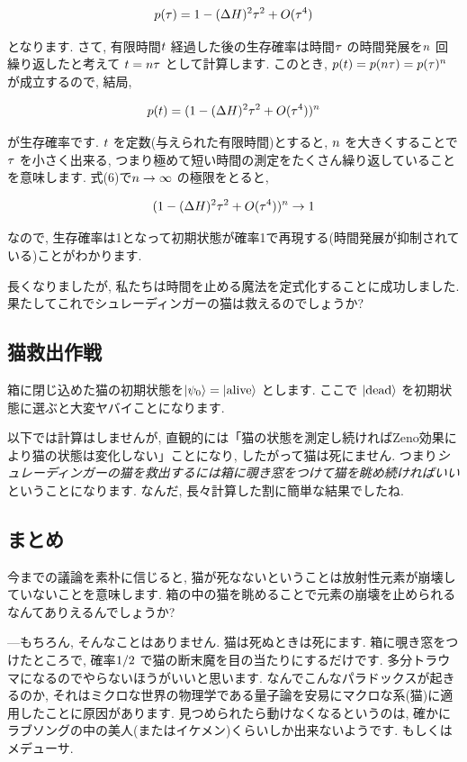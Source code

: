 \documentclass[10pt,b5jsbook,dvips,dvipdfmx,openany]{jsbook}
\theoremstyle{definition}
\begin{document}
    \[
    \mathinner{p(\tau) = 1 - (\Delta H ) ^2 \tau ^2 + O(\tau^4)}
    \]

    となります. さて, 有限時間$ \mathinner{t} $ 経過した後の生存確率は時間$ \mathinner{\tau} $ の時間発展を$ \mathinner{n} $ 回繰り返したと考えて $ \mathinner{t = n \tau} $ として計算します. このとき,  $ \mathinner{p(t) = p(n \tau ) = p(\tau) ^n} $ が成立するので, 結局,

    \[
    \mathinner{p(t) =  (1 - (\Delta H ) ^2 \tau ^2 + O(\tau^4))^n \label{eq:sp}}
    \]

    が生存確率です. $\mathinner{t}$ を定数(与えられた有限時間)とすると, $ \mathinner{n} $ を大きくすることで $ \mathinner{\tau} $ を小さく出来る, つまり極めて短い時間の測定をたくさん繰り返していることを意味します. 式(6)で$ \mathinner{n \to \infty} $ の極限をとると,

    \[
    \mathinner{(1 - (\Delta H ) ^2 \tau ^2 + O(\tau^4))^n  \to 1}
    \]

    なので, 生存確率は1となって初期状態が確率1で再現する(時間発展が抑制されている)ことがわかります.

    長くなりましたが, 私たちは時間を止める魔法を定式化することに成功しました. 果たしてこれでシュレーディンガーの猫は救えるのでしょうか?

    \subsection{猫救出作戦}
    箱に閉じ込めた猫の初期状態を$ \mathinner{\left|{\psi_{0}}\right\rangle} = \mathinner{\left|{\mathrm{alive}}\right\rangle} $ とします. ここで $ \mathinner{\left|{\mathrm{dead}}\right\rangle} $ を初期状態に選ぶと大変ヤバイことになります.

    以下では計算はしませんが, 直観的には「猫の状態を測定し続ければZeno効果により猫の状態は変化しない」ことになり, したがって猫は死にません. つまり\emph{シュレーディンガーの猫を救出するには箱に覗き窓をつけて猫を眺め続ければいい}ということになります. なんだ, 長々計算した割に簡単な結果でしたね.

    \subsection{まとめ}
    今までの議論を素朴に信じると, 猫が死なないということは放射性元素が崩壊していないことを意味します. 箱の中の猫を眺めることで元素の崩壊を止められるなんてありえるんでしょうか?

    ---もちろん, そんなことはありません. 猫は死ぬときは死にます. 箱に覗き窓をつけたところで, 確率$ \mathinner{1/2} $ で猫の断末魔を目の当たりにするだけです. 多分トラウマになるのでやらないほうがいいと思います. なんでこんなパラドックスが起きるのか, それはミクロな世界の物理学である量子論を安易にマクロな系(猫)に適用したことに原因があります. 見つめられたら動けなくなるというのは, 確かにラブソングの中の美人(またはイケメン)くらいしか出来ないようです. もしくはメデューサ.
\end{document}
